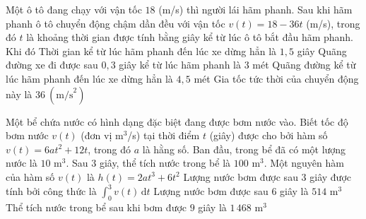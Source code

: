 \begin{ex}%
	Một ô tô đang chạy với vận tốc $18$ (m/s) thì người lái hãm phanh. Sau khi hãm phanh ô tô chuyển động chậm dần đều với  vận tốc $v\left( t \right)=18-36t$ (m/s), trong đó $t$ là khoảng thời gian được tính bằng giây kể từ lúc ô tô bắt đầu hãm phanh. Khi đó
	\choiceTF 
		{Thời  gian kể từ lúc hãm phanh đến lúc xe dừng hẳn là $1{,}5$ giây}
		 {Quãng đường xe đi được sau $0{,}3$ giây kể từ lúc hãm phanh là $3$ mét}
		{\True Quãng đường kể từ lúc hãm phanh đến lúc xe dừng hẳn là $4{,}5$ mét} 
		{Gia tốc tức  thời của chuyển động này là $36~\left(\text{m/s}^2\right)$}
\end{ex}

\begin{ex}%
	Một bể chứa nước có hình dạng đặc biệt đang được bơm nước vào. Biết tốc độ bơm nước $v(t)$ (đơn vị m$^3$/s) tại thời điểm $t$ (giây) được cho bởi  hàm số $v(t)=6a t^2+12t$, trong đó $a$ là hằng số. Ban đầu, trong bể đã có một lượng nước là $10$ m$^3$. Sau $3$ giây, thể tích nước trong bể là $100$ m$^3$.
	\choiceTF 
		{\True Một nguyên hàm của hàm số  $v(t)$ là $h(t)=2a t^3+6t^2$}
		{\True Lượng nước bơm  được sau $3$ giây được tính bởi công thức là $\displaystyle\int_0^3v(t) \mathrm{\,d}t$}
		{Lượng nước bơm được sau $6$  giây là $514$ m$^3$}
		{\True Thể tích nước trong bể sau khi bơm được $9$ giây là $1\,468$ m$^3$} 
\end{ex}

